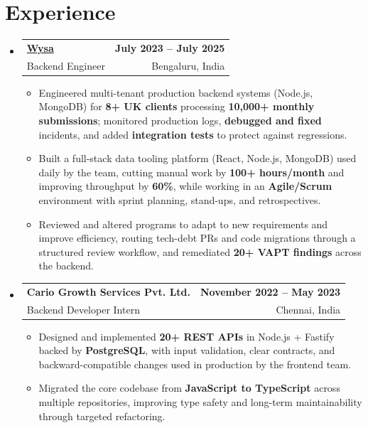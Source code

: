 \documentclass[letterpaper,10pt]{article}
\makeatletter
\newcommand{\resumeItem}[1]{
  \item\small{#1\vspace{-1pt}}
}
\newcommand{\resumeSubheading}[4]{
  \vspace{1pt}\item
    \begin{tabular*}{0.985\textwidth}[t]{l@{\extracolsep{\fill}}r}
      \textbf{#1} & \textbf{\small #2} \\
      {\small\color{ResumeSlate} #3} & {\small\color{ResumeSlate} #4} \\
    \end{tabular*}\vspace{-6pt}
}
\newcommand{\resumeSubHeadingListStart}{\begin{itemize}[leftmargin=0.0in, label={}, itemsep=2pt, topsep=2pt]}
\newcommand{\resumeSubHeadingListEnd}{\end{itemize}}
\newcommand{\resumeItemListStart}{\begin{itemize}[leftmargin=0.18in, itemsep=2pt, topsep=1pt]}
\newcommand{\resumeItemListEnd}{\end{itemize}\vspace{-4pt}}
\makeatother
\begin{document}
\section{Experience}
\resumeSubHeadingListStart
  \resumeSubheading
    {\href{https://www.wysa.io}{Wysa}}{July 2023 -- July 2025}
    {Backend Engineer}{Bengaluru, India}
    \resumeItemListStart
      \resumeItem{Engineered multi-tenant production backend systems (Node.js, MongoDB) for \textbf{8+ UK clients} processing \textbf{10{,}000+ monthly submissions}; monitored production logs, \textbf{debugged and fixed} incidents, and added \textbf{integration tests} to protect against regressions.}
      \resumeItem{Built a full-stack data tooling platform (React, Node.js, MongoDB) used daily by the team, cutting manual work by \textbf{100+ hours/month} and improving throughput by \textbf{60\%}, while working in an \textbf{Agile/Scrum} environment with sprint planning, stand-ups, and retrospectives.}
      \resumeItem{Reviewed and altered programs to adapt to new requirements and improve efficiency, routing tech-debt PRs and code migrations through a structured review workflow, and remediated \textbf{20+ VAPT findings} across the backend.}
    \resumeItemListEnd
  \resumeSubheading
    {Cario Growth Services Pvt. Ltd.}{November 2022 -- May 2023}
    {Backend Developer Intern}{Chennai, India}
    \resumeItemListStart
      \resumeItem{Designed and implemented \textbf{20+ REST APIs} in Node.js + Fastify backed by \textbf{PostgreSQL}, with input validation, clear contracts, and backward-compatible changes used in production by the frontend team.}
      \resumeItem{Migrated the core codebase from \textbf{JavaScript to TypeScript} across multiple repositories, improving type safety and long-term maintainability through targeted refactoring.}
    \resumeItemListEnd
\resumeSubHeadingListEnd
\vspace{-4pt}
\end{document}
